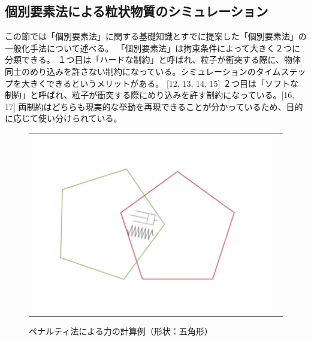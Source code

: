 \documentclass[12pt]{ltjsarticle}
\begin{document}
\subsection{個別要素法による粒状物質のシミュレーション}
この節では「個別要素法」に関する基礎知識とすでに提案した「個別要素法」の一般化手法について述べる。
「個別要素法」は拘束条件によって大きく２つに分類できる。
１つ目は「ハードな制約」と呼ばれ、粒子が衝突する際に、物体同士のめり込みを許さない制約になっている。シミュレーションのタイムステップを大きくできるというメリットがある。 [12, 13, 14, 15] 
２つ目は「ソフトな制約」と呼ばれ、粒子が衝突する際にめり込みを許す制約になっている。[16, 17]
両制約はどちらも現実的な挙動を再現できることが分かっているため、目的に応じて使い分けられている。
\\
\begin{figure}[htbp]
  \begin{tabular}{cc}
    \begin{minipage}[t]{.5\textwidth}
      \includegraphics*[keepaspectratio, scale=0.3]{penalty.PNG}
      \caption{ペナルティ法による力の計算例（形状：五角形）}
    \end{minipage} &


\end{tabular}
\end{figure}
\end{document}
